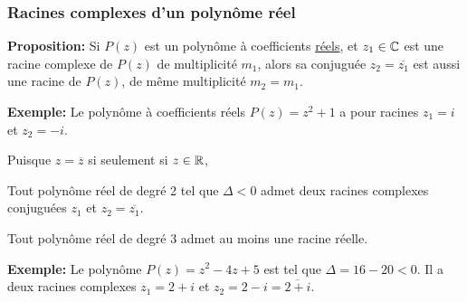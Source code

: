 \begin{frame}
\frametitle{\bf Racines complexes d'un polyn\^ome r\'eel} 
\medskip 

{\bf Proposition:}
Si $P(z)$ est un polyn\^ome \`a coefficients \underline{r\'eels}, et $z_1\in\mathbb C$ 
est une racine complexe de $P(z)$ de multiplicit\'e $m_1$, 
alors sa conjugu\'ee $z_2=\overline{z_1}$ est aussi une racine de $P(z)$, 
de m\^eme multiplicit\'e $m_2=m_1$. 
\vspace*{4mm}

{\small
{\bf Exemple:} Le polyn\^ome à coefficients r\'eels $P(z)=z^2+1$ a pour racines $z_1=i$ et $z_2=-i$. 
}
\vspace*{4mm}

\pause
{Puisque $z=\overline{z}$ si seulement si $z\in\mathbb R$,}  
\begin{itemize}
\bitem 
Tout polyn\^ome r\'eel de degré 2 tel que  $\Delta<0$ admet {deux racines complexes conjugu\'ees} $z_1$ et $z_2=\overline{z_1}$. 

\bitem  
Tout polyn\^ome r\'eel {de degr\'e $3$} 
admet {au moins une racine r\'eelle}.
\end{itemize}
\vspace*{4mm}

{\small
{\bf Exemple:} Le polyn\^ome $P(z)=z^2-4z+5$ est tel que $\Delta=16-20<0$. Il a deux racines complexes 
$z_1=2\!+\!i$ et $z_2=2\!-\!i=\overline{2\!+\!i}$. 
}
\end{frame}


